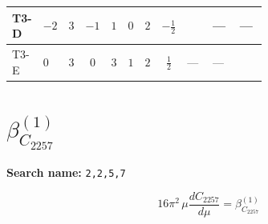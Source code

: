 \documentclass[8pt]{article}
\begin{document}
\begin{landscape}
\begin{longtable}{@{}llcccccc >{\raggedright\arraybackslash}p{0.21\linewidth} >{\raggedright\arraybackslash}p{0.21\linewidth} >{\raggedright\arraybackslash}p{0.21\linewidth}@{}}
\midrule
T3-D & $-2$ & $3$ & $-1$ & $1$ & $0$ & $2$ & $-\frac{1}{2}$ & \scriptsize\adjustbox{max width=\linewidth}{$\begin{gathered} - \frac{2 \sqrt{3} lambdaT_{3} \overline{y_{1}} \overline{y_{2}}}{3 MF}\end{gathered}$} & --- & --- \\
\midrule
T3-E & $0$ & $3$ & $0$ & $3$ & $1$ & $2$ & $\frac{1}{2}$ & --- & --- & \scriptsize\adjustbox{max width=\linewidth}{$\begin{gathered} \frac{2 \sqrt{6} lambdaT_{3} \overline{y_{1}} \overline{y_{2}}}{3 MF}\end{gathered}$} \\
\midrule
\bottomrule
\end{longtable}
\clearpage
\section*{$\beta_{C_{2257}}^{(1)}$}
\noindent\textbf{Search name: }\texttt{2,2,5,7}\par\smallskip
\[16\pi^2\,\mu\frac{d C_{2257}}{d\mu}=\beta_{C_{2257}}^{(1)}\]

\end{landscape}
\end{document}
